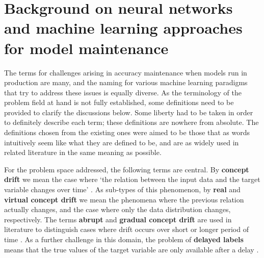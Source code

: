 \section{Background on neural networks and machine learning approaches for model maintenance}







The terms for challenges arising in accuracy maintenance when models run in production are many, and the naming for various machine learning paradigms that try to address these issues is equally diverse. As the terminology of the problem field at hand is not fully established, some definitions need to be provided to clarify the discussions below. Some liberty had to be taken in order to definitely describe each term; these definitions are nowhere from absolute. The definitions chosen from the existing ones were aimed to be those that as words intuitively seem like what they are defined to be, and are as widely used in related literature in the same meaning as possible. 

For the problem space addressed, the following terms are central. By \textbf{concept drift} we mean the case where `the relation between the input
data and the target variable changes over time' \cite{conceptdriftsurvey} \cite{schlimmer_incremental_1986}. As sub-types of this phenomenon, by \textbf{real} and \textbf{virtual concept drift} we mean the phenomena where the previous relation actually changes, and the case where only the data distribution changes, respectively. The terms \textbf{abrupt} and \textbf{gradual concept drift} are used in literature to distinguish cases where drift occurs over short or longer period of time \cite{zliobaite_driftsurvey}. As a further challenge in this domain, the problem of \textbf{delayed labels} means that the true values of the target variable are only available after a delay \cite{delayedlabelstreams}.


